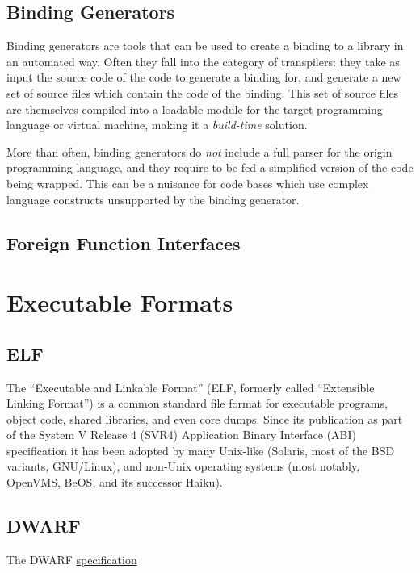 
\subsection{Binding Generators}

Binding generators are tools that can be used to create a binding to a library
in an automated way. Often they fall into the category of \glspl{transpiler}:
they take as input the source code of the code to generate a binding for,
and generate a new set of source files which contain the code of the binding.
This set of source files are themselves compiled into a loadable module for
the target programming language or virtual machine, making it a
\emph{build-time} solution.

More than often, binding generators do \emph{not} include a full parser for
the origin programming language, and they require to be fed a simplified
version of the code being wrapped. This can be a nuisance for code bases which
use complex language constructs unsupported by the binding generator.

%


\subsection{Foreign Function Interfaces}



%

\section{Executable Formats}

\subsection{ELF}

The “Executable and Linkable Format” (ELF, formerly called “Extensible Linking
Format”) is a common standard file format for executable programs, object
code, shared libraries, and even core dumps. Since its publication as part of
the System V Release 4 (SVR4) Application Binary Interface (ABI) specification
it has been adopted by many Unix-like (Solaris, most of the BSD variants,
GNU/Linux), and non-Unix operating systems (most notably, OpenVMS, BeOS, and
its successor Haiku).

\subsection{DWARF}

The DWARF \href{http://dwarfstd.org}{specification}


